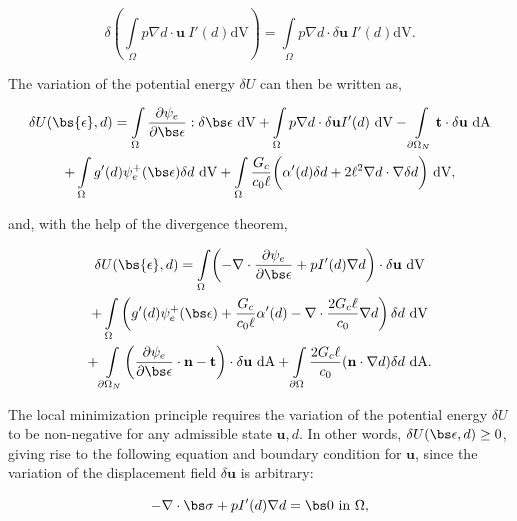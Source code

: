 \begin{equation}\label{dry variation}
    \delta \left( \int\limits_{\Omega} p \nabla d\cdot\textbf{u}\ I'(d)\text{dV} \right) = \int\limits_{\Omega} p \nabla d\cdot\delta\textbf{u}\ I'(d)\text{dV}.
\end{equation}

\noindent The variation of the potential energy $\delta U$ can then be written as,

\begin{multline}
    \delta U(\bs{\epsilon},d) = \int\limits_{\Omega}\dfrac{\partial\psi_e}{\partial \bs \epsilon}:\delta\bs\epsilon\ \text{dV} + \int\limits_{\Omega} p \nabla d\cdot\delta\textbf{u}I'(d)\ \text{dV} 
    - \int\limits_{\partial \Omega_N} \textbf{t}\cdot\delta\textbf{u} \ \text{dA} \\
    + \int\limits_{\Omega}g'(d) \psi_e^+(\bs\epsilon)\delta d\ \text{dV}
    + \int\limits_{\Omega}\dfrac{G_c}{c_0\ell}\bigg( \alpha'(d)\delta d + 2\ell^2\nabla d \cdot \nabla \delta d\bigg)\ \text{dV},
\end{multline}

\noindent and, with the help of the divergence theorem, 

\begin{multline}
    \delta U(\bs{\epsilon},d) = \int\limits_{\Omega}\biggl(-\nabla \cdot \dfrac{\partial\psi_e}{\partial \bs \epsilon} + pI'(d) \nabla d\biggr)\cdot\delta\textbf{u}\ \text{dV} \\
    + \int\limits_{\Omega}\left(g'(d) \psi_e^+(\bs\epsilon)
    + \dfrac{G_c}{c_0\ell}\alpha'(d) - \nabla \cdot\dfrac{2G_c\ell}{c_0}\nabla d \right)\delta d\ \text{dV} \\
    + \int\limits_{\partial \Omega_N}\biggl( \dfrac{\partial\psi_e}{\partial \bs \epsilon}\cdot\textbf{n}  -\textbf{t}\biggr)\cdot\delta\textbf{u} \ \text{dA}
    + \int\limits_{\partial\Omega} \dfrac{2G_c\ell}{c_0}(\textbf{n}\cdot\nabla d)  \delta d\ \text{dA}.
\end{multline}

The local minimization principle requires the variation of the potential energy $\delta U$ to be non-negative for any admissible state $\textbf{u},d$. In other words, $\delta U(\bs\epsilon, d) \ge 0$, giving rise to the following equation and boundary condition for $\textbf{u}$, since the variation of the displacement field $\delta \textbf{u}$ is arbitrary:

\begin{equation}\label{disp equation}
    -\nabla \cdot \bs \sigma  + pI'(d) \nabla d = \bs 0 \text{ in }\Omega,
\end{equation}

